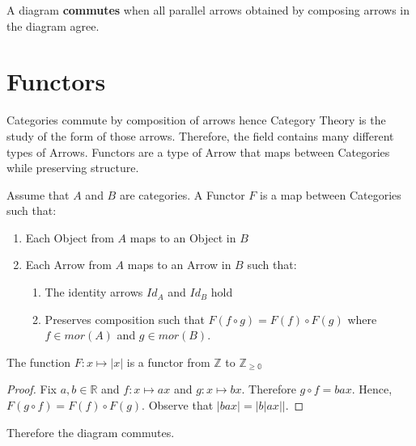 \documentclass{article}
\begin{document}
\begin{definition}
    A diagram \textbf{commutes} when all parallel arrows obtained by composing arrows in the diagram agree.
\end{definition}


\section{Functors}
Categories commute by composition of arrows hence Category Theory is the study of the form of those arrows. Therefore, the field contains many different types of Arrows. Functors are a type of Arrow that maps between Categories while preserving structure.
\begin{definition}
    Assume that $A$ and $B$ are categories. A Functor $F$ is a map between Categories such that:
    \begin{enumerate}
        \item Each Object from $A$ maps to an Object in $B$
        \item Each Arrow from $A$ maps to an Arrow in $B$ such that:
        \begin{enumerate}
            \item The identity arrows  $Id_A$ and $Id_B$ hold
            \item Preserves composition such that $F(f \circ g) = F(f)\circ F(g)$ where $f \in mor(A)$ and $g \in mor(B)$.
        \end{enumerate}
    \end{enumerate}
\end{definition}

\begin{theorem}
The function $F: x \mapsto |x|$ is a functor from $\mathbb{Z}$ to $\mathbb{Z_{\ge 0}}$
\end{theorem}
\begin{proof}
Fix $a,b \in \mathbb{R}$ and $f: x \mapsto ax$ and $g: x \mapsto bx$. Therefore $g \circ f = bax$. Hence, $F(g \circ f) = F(f) \circ F(g)$. Observe that $|bax| = |b|ax||$.
\end{proof}
\begin{center}
\end{center}
Therefore the diagram commutes.



\end{document}
